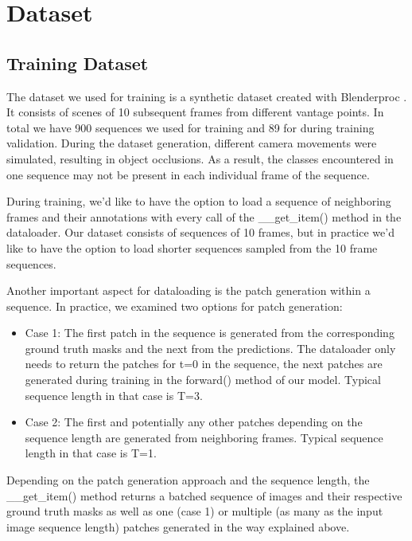 \chapter{Dataset}\label{chapter:Dataset}
\section{Training Dataset}

The dataset we used for training is a synthetic dataset created with Blenderproc \cite{denninger2019blenderproc}. It consists of scenes of 10 subsequent frames from different vantage points. In total we have 900 sequences we used for training and 89 for during training validation. During the dataset generation, different camera movements were simulated, resulting in object occlusions. As a result, the classes encountered in one sequence may not be present in each individual frame of the sequence. \par

During training, we'd like to have the option to load a sequence of neighboring frames and their annotations with every call of the \_\_get\_item() method in the dataloader. Our dataset consists of sequences of 10 frames, but in practice we'd like to have the option to load shorter sequences sampled from the 10 frame sequences. \par 

Another important aspect for dataloading is the patch generation within a sequence. In practice, we examined two options for patch generation:
\begin{itemize}
    \item Case 1: The first patch in the sequence is generated from the corresponding ground truth masks and the next from the predictions. The dataloader only needs to return the patches for t=0 in the sequence, the next patches are generated during training in the forward() method of our model. Typical sequence length in that case is T=3.
    \item Case 2: The first and potentially any other patches depending on the sequence length are generated from neighboring frames. Typical sequence length in that case is T=1. 
\end{itemize}

Depending on the patch generation approach and the sequence length, the \_\_get\_item() method returns a batched sequence of images and their respective ground truth masks as well as one (case 1) or multiple (as many as the input image sequence length) patches generated in the way explained above.

